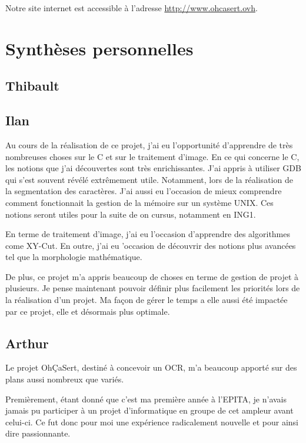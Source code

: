 \documentclass[11pt]{report}
\begin{document}
Notre site internet est accessible à l'adresse \url{http://www.ohcasert.ovh}.

\chapter{Synthèses personnelles}

\section{Thibault}




\section{Ilan}

Au cours de la réalisation de ce projet, j'ai eu l’opportunité d'apprendre de très nombreuses choses sur le C et sur le traitement d'image. En ce qui concerne le C, les notions que j'ai découvertes sont très enrichissantes. J'ai appris à utiliser GDB qui s'est souvent révélé extrêmement utile. Notamment, lors de la réalisation de la segmentation des caractères. J'ai aussi eu l'occasion de mieux comprendre comment fonctionnait la gestion de la mémoire sur un système UNIX. Ces notions seront utiles pour la suite de on cursus, notamment en ING1.

En terme de traitement d'image, j'ai eu l'occasion d'apprendre des algorithmes come XY-Cut. En outre, j'ai eu 'occasion de découvrir des notions plus avancées tel que la morphologie mathématique.

De plus, ce projet m'a appris beaucoup de choses en terme de gestion de projet à plusieurs. Je pense maintenant pouvoir définir plus facilement les priorités lors de la réalisation d'un projet. Ma façon de gérer le temps a elle aussi été impactée par ce projet, elle et désormais plus optimale.

\section{Arthur}

Le projet OhÇaSert, destiné à concevoir un OCR, m’a beaucoup apporté sur des plans aussi nombreux que variés.

Premièrement, étant donné que c’est ma première année à l’EPITA, je n’avais jamais pu participer à un projet d’informatique en groupe de cet ampleur avant celui-ci. Ce fut donc pour moi une expérience radicalement nouvelle et pour ainsi dire passionnante.
\end{document}
